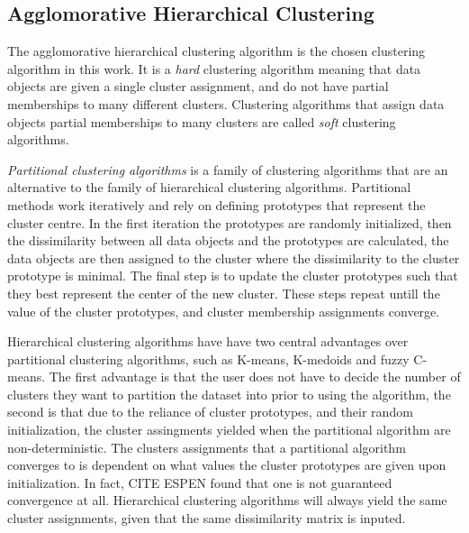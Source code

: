 \subsection{Agglomorative Hierarchical Clustering}

The agglomorative hierarchical clustering algorithm is the chosen clustering algorithm in this work. It is a \textit{hard} clustering algorithm meaning that data objects are given a single cluster assignment, and do not have partial memberships to many different clusters. Clustering algorithms that assign data objects partial memberships to many clusters are called \textit{soft} clustering algorithms. \bigskip

\textit{Partitional clustering algorithms} is a family of clustering algorithms that are an alternative to the family of hierarchical clustering algorithms. Partitional methods work iteratively and rely on defining prototypes that represent the cluster centre. In the first iteration the prototypes are randomly initialized, then the dissimilarity between all data objects and the prototypes are calculated, the data objects are then assigned to the cluster where the dissimilarity to the cluster prototype is minimal. The final step is to update the cluster prototypes such that they best represent the center of the new cluster. These steps repeat untill the value of the cluster prototypes, and cluster membership assignments converge. \bigskip

Hierarchical clustering algorithms have have two central advantages over partitional clustering algorithms, such as K-means, K-medoids and fuzzy C-means. The first advantage is that the user does not have to decide the number of clusters they want to partition the dataset into prior to using the algorithm, the second is that due to the reliance of cluster prototypes, and their random initialization, the cluster assingments yielded when the partitional algorithm are non-deterministic. The clusters assignments that a partitional algorithm converges to is dependent on what values the cluster prototypes are given upon initialization. In fact, CITE ESPEN found that one is not guaranteed convergence at all. Hierarchical clustering algorithms will always yield the same cluster assignments, given that the same dissimilarity matrix is inputed. \bigskip

